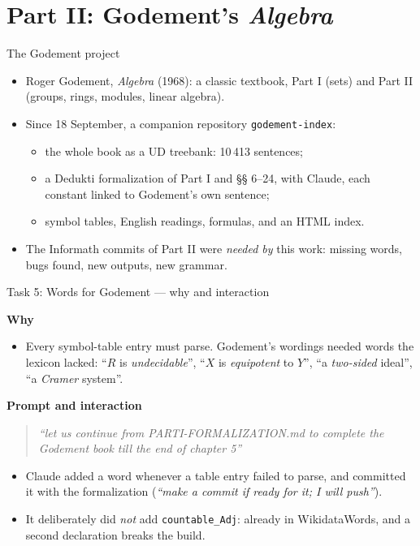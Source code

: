 \documentclass[10pt,aspectratio=169]{beamer}
\newcommand{\prompt}[1]{\begin{quote}\small\itshape ``#1''\end{quote}}
\newcommand{\why}{\par\textcolor{gfblue}{\textbf{Why}}\par}
\newcommand{\how}{\par\textcolor{gfblue}{\textbf{Prompt and interaction}}\par}
\begin{document}
\section{Part II: Godement's \emph{Algebra}}

\begin{frame}{The Godement project}
  \begin{itemize}
    \item Roger Godement, \emph{Algebra} (1968): a classic textbook,
          Part I (sets) and Part II (groups, rings, modules, linear algebra).
    \item Since 18 September, a companion repository \texttt{godement-index}:
      \begin{itemize}\small
        \item the whole book as a UD treebank: 10\,413 sentences;
        \item a Dedukti formalization of Part I and §§ 6--24, with Claude,
              each constant linked to Godement's own sentence;
        \item symbol tables, English readings, formulas, and an HTML index.
      \end{itemize}
    \item The Informath commits of Part II were \emph{needed by} this work:
          missing words, bugs found, new outputs, new grammar.
  \end{itemize}
\end{frame}

\begin{frame}{Task 5: Words for Godement --- why and interaction}
  \why
  \begin{itemize}\small
    \item Every symbol-table entry must parse. Godement's wordings needed words
          the lexicon lacked: ``$R$ is \emph{undecidable}'', ``$X$ is
          \emph{equipotent} to $Y$'', ``a \emph{two-sided} ideal'',
          ``a \emph{Cramer} system''.
  \end{itemize}
  \how
  \prompt{let us continue from PARTI-FORMALIZATION.md to complete the Godement
    book till the end of chapter 5}
  \begin{itemize}\small
    \item Claude added a word whenever a table entry failed to parse, and
          committed it with the formalization (\emph{``make a commit if ready for it; I will push''}).
    \item It deliberately did \emph{not} add \texttt{countable\_Adj}: already in
          WikidataWords, and a second declaration breaks the build.
  \end{itemize}
\end{frame}
\end{document}
